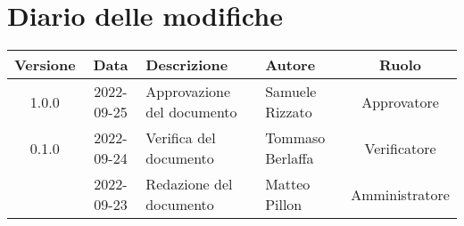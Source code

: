 \section*{Diario delle modifiche}
	\begin{center}
	\renewcommand{\arraystretch}{1.8} %
	\begin{tabular}{ |c|c|m{12em}|m{7em}|c| }
	\hline
	\textbf{Versione} & \textbf{Data} & \textbf{Descrizione} &  \textbf{Autore} &  \textbf{Ruolo} \\ %
	\hline
    1.0.0 & 2022-09-25 & Approvazione del documento & Samuele \newline Rizzato & Approvatore\\ 
	\hline
   0.1.0 & 2022-09-24 & Verifica del documento & Tommaso \newline Berlaffa  & Verificatore\\ 
	\hline
    & 2022-09-23 & Redazione del documento & Matteo \newline Pillon & Amministratore\\ 
	\hline
	\end{tabular}
	\end{center}
	\newpage